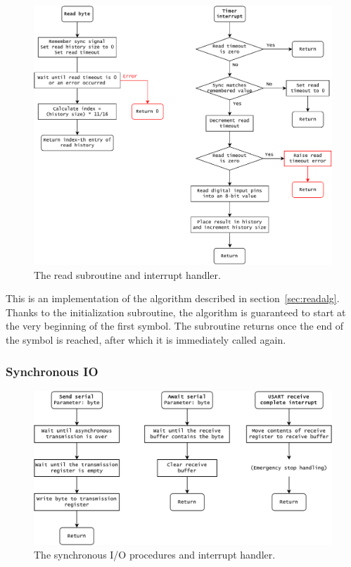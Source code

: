 \documentclass{article}
\begin{document}
	\begin{figure}[h]
		\includegraphics[width=\linewidth]{img/read}
		\caption{The read subroutine and interrupt handler.}
	\end{figure}
	
	This is an implementation of the algorithm described in
	section~\ref{sec:readalg}. Thanks to the initialization subroutine, the
	algorithm is guaranteed to start at the very beginning of the first symbol.
	The subroutine returns once the end of the symbol is reached, after which
	it is immediately called again.
	
	\newpage
	\subsubsection{Synchronous IO}
	
	\begin{figure}[h]
		\includegraphics[width=\linewidth]{img/sync}
		\caption{The synchronous I/O procedures and interrupt handler.}
	\end{figure}
	
\end{document}
